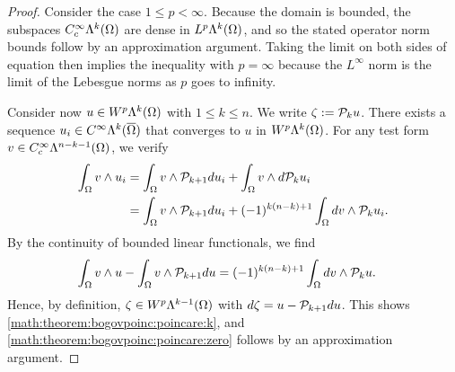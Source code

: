 \documentclass[10pt,a4paper]{article}
\begin{document}
\begin{proof}
    Consider the case $1 \leq p < \infty$.
    Because the domain is bounded, 
    the subspaces $C^{\infty}_{c}\Lambda^{k}(\Omega)$ are dense in $L^{p}\Lambda^{k}(\Omega)$,
    and so the stated operator norm bounds follow by an approximation argument. 
    Taking the limit on both sides of equation then implies the inequality with $p = \infty$
    because the $L^{\infty}$ norm is the limit of the Lebesgue norms as $p$ goes to infinity. 
    
    
    Consider now $u \in W^{p}\Lambda^{k}(\Omega)$ with $1 \leq k \leq n$. 
    We write $\zeta := {\mathcal P}_{k  } u$. 
    There exists a sequence $u_{i} \in C^{\infty}\Lambda^{k}(\overline\Omega)$ that converges to $u$ in $W^{p}\Lambda^{k}(\Omega)$. 
    For any test form $v \in C^{\infty}_{c}\Lambda^{n-k-1}(\Omega)$, we verify 
    \begin{align*}
        \int_{\Omega} v \wedge u_{i} 
        &=
        \int_{\Omega} v \wedge {\mathcal P}_{k+1} d u_{i}
        +
        \int_{\Omega} v \wedge d {\mathcal P}_{k  } u_{i}
        \\&=
        \int_{\Omega} v \wedge {\mathcal P}_{k+1} d u_{i}
        +
        (-1)^{k(n-k)+1}
        \int_{\Omega} d v \wedge {\mathcal P}_{k  } u_{i}
        .
    \end{align*}
    By the continuity of bounded linear functionals, we find 
    \begin{align*}
        \int_{\Omega} v \wedge u 
        -
        \int_{\Omega} v \wedge {\mathcal P}_{k+1} d u 
        &=
        (-1)^{k(n-k)+1}
        \int_{\Omega} d v \wedge {\mathcal P}_{k  } u 
        .
    \end{align*}
    Hence, by definition, $\zeta \in W^{p}\Lambda^{k-1}(\Omega)$ with $d \zeta = u - {\mathcal P}_{k+1} d u$.
    This shows \eqref{math:theorem:bogovpoinc:poincare:k}, and \eqref{math:theorem:bogovpoinc:poincare:zero} follows by an approximation argument.
    
    
    

\end{proof}
\end{document}
